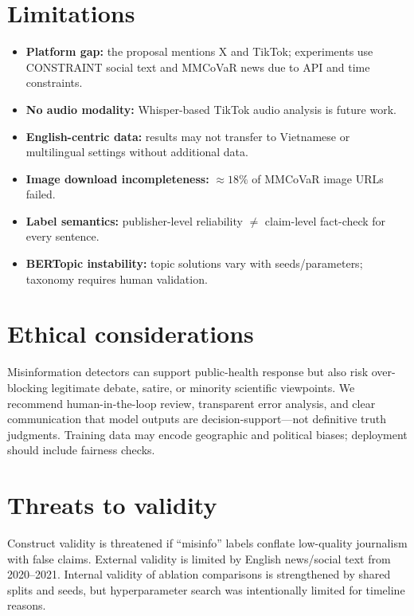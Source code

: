 \section{Limitations}

\begin{itemize}
  \item \textbf{Platform gap:} the proposal mentions X and TikTok; experiments use CONSTRAINT social text and MMCoVaR news due to API and time constraints.
  \item \textbf{No audio modality:} Whisper-based TikTok audio analysis is future work.
  \item \textbf{English-centric data:} results may not transfer to Vietnamese or multilingual settings without additional data.
  \item \textbf{Image download incompleteness:} $\approx 18\%$ of MMCoVaR image URLs failed.
  \item \textbf{Label semantics:} publisher-level reliability $\neq$ claim-level fact-check for every sentence.
  \item \textbf{BERTopic instability:} topic solutions vary with seeds/parameters; taxonomy requires human validation.
\end{itemize}

\section{Ethical considerations}

Misinformation detectors can support public-health response but also risk over-blocking legitimate debate, satire, or minority scientific viewpoints.
We recommend human-in-the-loop review, transparent error analysis, and clear communication that model outputs are decision-support---not definitive truth judgments.
Training data may encode geographic and political biases; deployment should include fairness checks.

\section{Threats to validity}

Construct validity is threatened if ``misinfo'' labels conflate low-quality journalism with false claims.
External validity is limited by English news/social text from 2020--2021.
Internal validity of ablation comparisons is strengthened by shared splits and seeds, but hyperparameter search was intentionally limited for timeline reasons.
